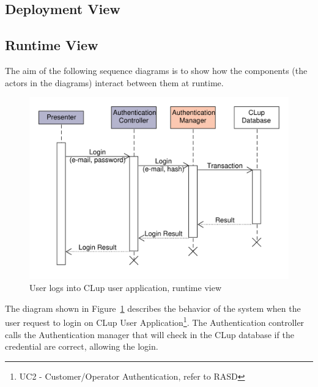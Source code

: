 \subsection{Deployment View}
\clearpage
\subsection{Runtime View}
The aim of the following sequence diagrams is to show how the components (the actors in the diagrams) interact between them at runtime. 
\begin{figure}[H]
    \includegraphics[width=\textwidth]{Images/UML_login_sequence.pdf}
    \caption{\label{fig:UML_login_sequence}User logs into CLup user application, runtime view}
\end{figure}
The diagram shown in Figure~\ref{fig:UML_login_sequence} describes the behavior of the system when the user request to login on CLup User Application\footnote{UC2 - Customer/Operator Authentication, refer to RASD}. The Authentication controller calls the Authentication manager that will check in the CLup database if the credential are correct, allowing the login.

